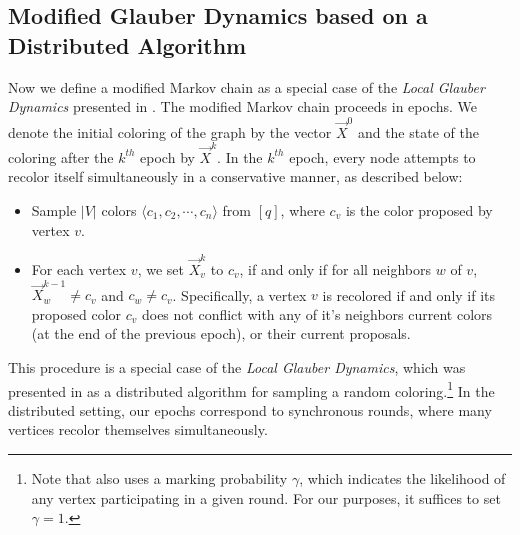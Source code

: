 \subsection{Modified Glauber Dynamics based on a Distributed Algorithm}%
\label{sec:modified_glauber_dynamics}

Now we define a modified Markov chain as a special case of the \emph{Local Glauber Dynamics} presented in \cite{ghaffari_fischer}.
The modified Markov chain proceeds in epochs.
We denote the initial coloring of the graph by the vector $\vec X^0$ and the state of the coloring after the $k^{th}$ epoch by $\vec X^k$.
In the $k^{th}$ epoch, every node attempts to recolor itself simultaneously in a conservative manner, as described below:
\begin{itemize}
    \item Sample $|V|$ colors $ \langle c_1, c_2,\cdots, c_n \rangle$ from $[q]$, where $c_v$ is the color proposed by vertex $v$.
    \item For each vertex $v$, we set $\vec X^k_v$ to $c_v$, if and only if for all neighbors $w$ of $v$, $\vec X^{k-1}_w\not=c_v$ and $c_w\not=c_v$.
Specifically, a vertex $v$ is recolored if and only if its proposed color $c_v$
does not conflict with any of it's neighbors current colors (at the end of the previous epoch), or their current proposals.
\end{itemize}

This procedure is a special case of the \emph{Local Glauber Dynamics},
which was presented in \cite{ghaffari_fischer} as a distributed algorithm for sampling a random coloring.\footnote{
Note that \cite{ghaffari_fischer} also uses a marking probability $\gamma$,
which indicates the likelihood of any vertex participating in a given round.
For our purposes, it suffices to set $\gamma = 1$.}
In the distributed setting, our epochs correspond to synchronous rounds, where many vertices recolor themselves simultaneously.

